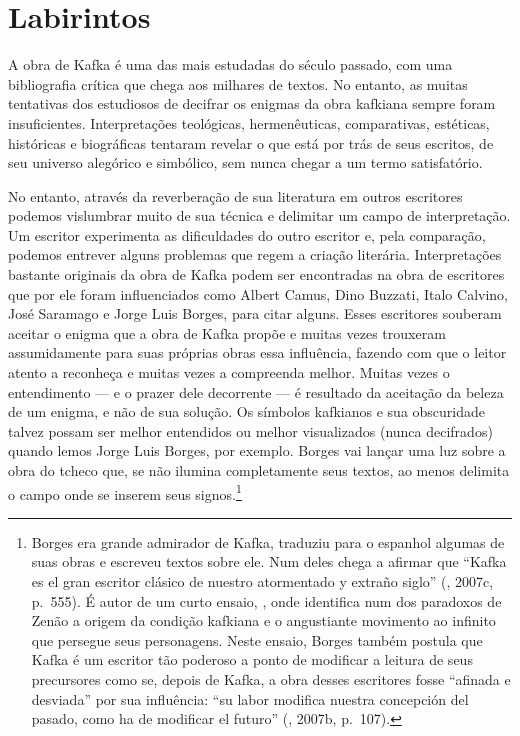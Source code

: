 \chapter{Labirintos}

A obra de Kafka é uma das mais estudadas do século passado, com uma
bibliografia crítica que chega aos milhares de textos. No entanto, as
muitas tentativas dos estudiosos de decifrar os enigmas da obra kafkiana
sempre foram insuficientes. Interpretações teológicas, hermenêuticas,
comparativas, estéticas, históricas e biográficas tentaram revelar o
que está por trás de seus escritos, de seu universo alegórico e
simbólico, sem nunca chegar a um termo satisfatório.

No entanto, através da reverberação de sua literatura em outros
escritores podemos vislumbrar muito de sua técnica e delimitar um campo
de interpretação. Um escritor experimenta as dificuldades do outro
escritor e, pela comparação, podemos entrever alguns problemas que regem
a criação literária. Interpretações bastante originais da obra de Kafka
podem ser encontradas na obra de escritores que por ele foram
influenciados como Albert Camus, Dino Buzzati, Italo Calvino, José
Saramago e Jorge Luis Borges, para citar alguns. Esses escritores
souberam aceitar o enigma que a obra de Kafka propõe e muitas vezes
trouxeram assumidamente para suas próprias obras essa influência,
fazendo com que o leitor atento a reconheça e muitas vezes a compreenda
melhor. Muitas vezes o entendimento --- e o prazer dele decorrente --- é
resultado da aceitação da beleza de um enigma, e não de sua solução. Os
símbolos kafkianos e sua obscuridade talvez possam ser melhor entendidos
ou melhor visualizados (nunca decifrados) quando lemos Jorge Luis
Borges, por exemplo. Borges vai lançar uma luz sobre a obra do tcheco
que, se não ilumina completamente seus textos, ao menos delimita o campo
onde se inserem seus signos.\footnote{Borges era grande admirador de
  Kafka, traduziu para o espanhol algumas de suas obras e escreveu
  textos sobre ele. Num deles chega a afirmar que ``Kafka es el gran
  escritor clásico de nuestro atormentado y extraño siglo'' (,
  2007c, p.~555). É autor de um curto ensaio, {}, onde identifica num dos paradoxos de Zenão a origem da
  condição kafkiana e o angustiante movimento ao infinito que persegue
  seus personagens. Neste ensaio, Borges também postula que Kafka é um
  escritor tão poderoso a ponto de modificar a leitura de seus
  precursores como se, depois de Kafka, a obra desses escritores fosse
  ``afinada e desviada'' por sua influência: ``su labor modifica nuestra
  concepción del pasado, como ha de modificar el futuro'' (,
  2007b, p.~107).}

